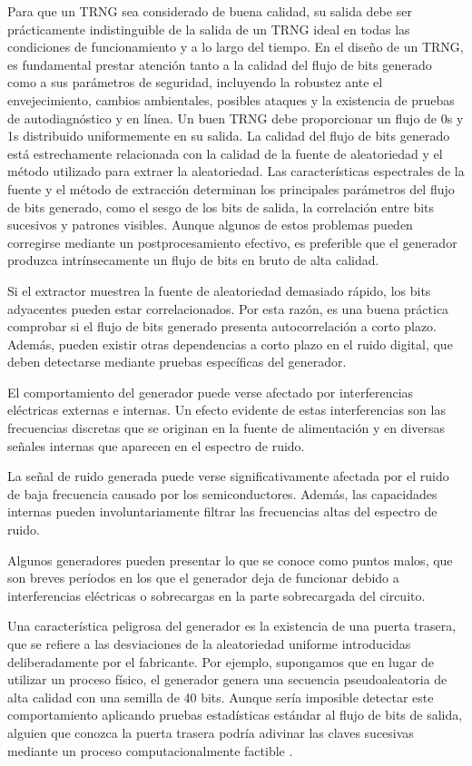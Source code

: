                 Para que un TRNG sea considerado de buena calidad, su salida debe ser prácticamente indistinguible de la salida de un TRNG ideal en todas las condiciones de funcionamiento y a lo largo del tiempo. En el diseño de un TRNG, es fundamental prestar atención tanto a la calidad del flujo de bits generado como a sus parámetros de seguridad, incluyendo la robustez ante el envejecimiento, cambios ambientales, posibles ataques y la existencia de pruebas de autodiagnóstico y en línea.
                Un buen TRNG debe proporcionar un flujo de 0s y 1s distribuido uniformemente en su salida. La calidad del flujo de bits generado está estrechamente relacionada con la calidad de la fuente de aleatoriedad y el método utilizado para extraer la aleatoriedad. Las características espectrales de la fuente y el método de extracción determinan los principales parámetros del flujo de bits generado, como el sesgo de los bits de salida, la correlación entre bits sucesivos y patrones visibles. Aunque algunos de estos problemas pueden corregirse mediante un postprocesamiento efectivo, es preferible que el generador produzca intrínsecamente un flujo de bits en bruto de alta calidad.

                Si el extractor muestrea la fuente de aleatoriedad demasiado rápido, los bits adyacentes pueden estar correlacionados. Por esta razón, es una buena práctica comprobar si el flujo de bits generado presenta autocorrelación a corto plazo. Además, pueden existir otras dependencias a corto plazo en el ruido digital, que deben detectarse mediante pruebas específicas del generador.

                El comportamiento del generador puede verse afectado por interferencias eléctricas externas e internas. Un efecto evidente de estas interferencias son las frecuencias discretas que se originan en la fuente de alimentación y en diversas señales internas que aparecen en el espectro de ruido.

                La señal de ruido generada puede verse significativamente afectada por el ruido de baja frecuencia causado por los semiconductores. Además, las capacidades internas pueden involuntariamente filtrar las frecuencias altas del espectro de ruido.

                Algunos generadores pueden presentar lo que se conoce como puntos malos, que son breves períodos en los que el generador deja de funcionar debido a interferencias eléctricas o sobrecargas en la parte sobrecargada del circuito.

                Una característica peligrosa del generador es la existencia de una puerta trasera, que se refiere a las desviaciones de la aleatoriedad uniforme introducidas deliberadamente por el fabricante. Por ejemplo, supongamos que en lugar de utilizar un proceso físico, el generador genera una secuencia pseudoaleatoria de alta calidad con una semilla de 40 bits. Aunque sería imposible detectar este comportamiento aplicando pruebas estadísticas estándar al flujo de bits de salida, alguien que conozca la puerta trasera podría adivinar las claves sucesivas mediante un proceso computacionalmente factible \cite{Petura2019}. 

